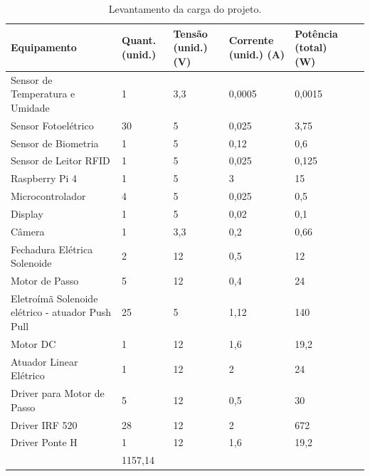 \begin{table}[htb]
    \centering
    \caption{Levantamento da carga do projeto.}
    \label{fig:energia_carga}
    \begin{adjustbox}{max width = \textwidth}
        \begin{tabular}{|L{5cm}|C{2cm}|C{2cm}|C{2cm}|C{2cm}|C{2cm}|}
            \hline
            \textbf{Equipamento} & \textbf{Quant. (unid.)} & \textbf{Tensão (unid.) (V)} & \textbf{Corrente (unid.) (A)} & \textbf{Potência (total) (W)} \\ \hline
            Sensor de Temperatura e Umidade & 1	 & 3,3 & 0,0005 & 0,0015
            \\ \hline
              Sensor Fotoelétrico & 30	 & 5  & 0,025 & 3,75
             \\ \hline
             Sensor de Biometria & 1 & 5 & 0,12 & 0,6
             \\ \hline
             Sensor de Leitor RFID & 1	 & 5 & 0,025 & 0,125
             \\ \hline
              Raspberry Pi 4 & 1 & 5 & 3 & 15
             \\ \hline
               Microcontrolador & 4 & 5 & 0,025 & 0,5
             \\ \hline
               Display & 1 & 5 & 0,02 & 0,1
             \\ \hline
               Câmera & 1 & 3,3 & 0,2 & 0,66
             \\ \hline
              Fechadura Elétrica Solenoide & 2 & 12 & 0,5 & 12
             \\ \hline
              Motor de Passo & 5 & 12 & 0,4 & 24
             \\ \hline
              Eletroímã Solenoide elétrico - atuador Push Pull & 25 & 5 & 1,12 & 140
             \\ \hline
                Motor DC & 1 & 12 & 1,6 & 19,2
             \\ \hline
                 Atuador Linear Elétrico & 1 & 12 & 2 & 24
             \\ \hline
               Driver para Motor de Passo & 5 & 12 & 0,5 & 30
             \\ \hline
                Driver IRF 520 & 28 & 12 & 2 & 672
             \\ \hline
                  Driver Ponte H & 1 & 12 & 1,6 & 19,2
             \\ \hline
              & 1157,14 \\
             \hline
        \end{tabular}
    \end{adjustbox}
\end{table}

